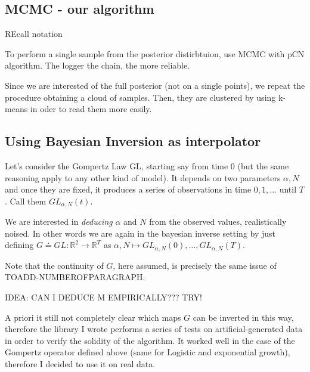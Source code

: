 \documentclass[6pt]{article}
\begin{document}
\subsection {MCMC - our algorithm}
REcall notation

To perform a single sample from the posterior distirbtuion,
use MCMC with pCN algorithm. The logger the chain, the more reliable.

Since we are interested of the full posterior (not on a single points),
we repeat the procedure obtaining a cloud of samples. Then, they are
clustered by using k-means in oder to read them more easily.

\subsection {Using Bayesian Inversion as interpolator}
Let's consider the Gompertz Law GL, starting say from time $0$
(but the same reasoning apply to any other kind of model).
It depends on two parameters $\alpha, N$ and once they are fixed,
it produces a series of observations in time $0, 1,...$ until $T$.
Call them $GL_{\alpha, N}(t)$.

We are interested in \emph{deducing} $\alpha$ and $N$ from the observed values,
realistically noised. In other words we are again in the bayesian inverse 
setting by just defining 
$G \doteq GL : \mathbb{R}^2 \to \mathbb{R}^T$ as
$\alpha, N \mapsto GL_{\alpha, N} (0), \dots, GL_{\alpha, N} (T)$.

Note that the continuity of $G$, here assumed, is precisely the same issue
of TOADD-NUMBEROFPARAGRAPH. 

IDEA: CAN I DEDUCE M EMPIRICALLY??? TRY!

A priori it still not completely clear which maps $G$ can be inverted in this way, therefore the library I wrote performs a series of tests on artificial-generated
data in order to verify the solidity of the algorithm. It worked well in the case of the Gompertz operator defined above (same for Logistic and exponential growth),
therefore I decided to use it on real data.
\end{document}
